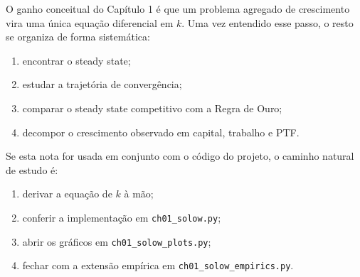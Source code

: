 \documentclass[11pt,a4paper]{article}
\begin{document}
O ganho conceitual do Cap\'itulo 1 \'e que um problema agregado de crescimento
vira uma \'unica equa\c{c}\~ao diferencial em \(k\). Uma vez entendido esse
passo, o resto se organiza de forma sistem\'atica:
\begin{enumerate}
  \item encontrar o steady state;
  \item estudar a trajet\'oria de converg\^encia;
  \item comparar o steady state competitivo com a Regra de Ouro;
  \item decompor o crescimento observado em capital, trabalho e PTF.
\end{enumerate}

Se esta nota for usada em conjunto com o c\'odigo do projeto, o caminho natural
de estudo \'e:
\begin{enumerate}
  \item derivar a equa\c{c}\~ao de \(k\) \`a m\~ao;
  \item conferir a implementa\c{c}\~ao em \texttt{ch01\_solow.py};
  \item abrir os gr\'aficos em \texttt{ch01\_solow\_plots.py};
  \item fechar com a extens\~ao emp\'irica em \texttt{ch01\_solow\_empirics.py}.
\end{enumerate}
\end{document}
